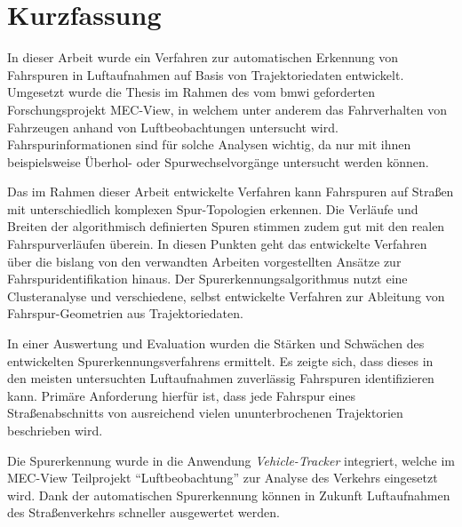 
\chapter{Kurzfassung}

In dieser Arbeit wurde ein Verfahren zur automatischen Erkennung von Fahrspuren in Luftaufnahmen
auf Basis von Trajektoriedaten entwickelt. Umgesetzt wurde die Thesis im Rahmen des vom \acrshort*{bmwi}
geforderten Forschungsprojekt MEC-View, in welchem unter anderem das Fahrverhalten von Fahrzeugen
anhand von Luftbeobachtungen untersucht wird. Fahrspurinformationen sind für solche Analysen
wichtig, da nur mit ihnen beispielsweise Überhol- oder Spurwechselvorgänge untersucht werden können.

Das im Rahmen dieser Arbeit entwickelte Verfahren kann Fahrspuren auf Straßen mit unterschiedlich komplexen Spur-Topologien erkennen.
Die Verläufe und Breiten der algorithmisch definierten Spuren stimmen zudem gut mit den realen
Fahrspurverläufen überein. In diesen Punkten geht das entwickelte Verfahren über die bislang von den
verwandten Arbeiten vorgestellten Ansätze zur Fahrspuridentifikation hinaus.
Der Spurerkennungsalgorithmus nutzt eine Clusteranalyse und verschiedene, selbst entwickelte Verfahren zur
Ableitung von Fahrspur-Geometrien aus Trajektoriedaten.

In einer Auswertung und Evaluation wurden die Stärken und Schwächen des entwickelten Spurerkennungsverfahrens ermittelt.
Es zeigte sich, dass dieses in den meisten untersuchten Luftaufnahmen zuverlässig Fahrspuren identifizieren kann.
Primäre Anforderung hierfür ist, dass jede Fahrspur eines Straßenabschnitts von ausreichend vielen ununterbrochenen
Trajektorien beschrieben wird.

Die Spurerkennung wurde in die Anwendung \textit{Vehicle-Tracker} integriert,
welche im MEC-View Teilprojekt ``Luftbeobachtung'' zur Analyse des Verkehrs eingesetzt wird.
Dank der automatischen Spurerkennung können in Zukunft Luftaufnahmen des Straßenverkehrs schneller
ausgewertet werden.

